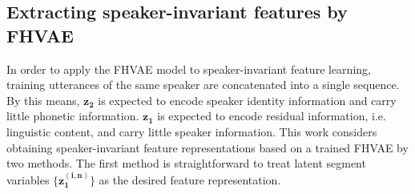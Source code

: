 \documentclass[a4paper]{article}
\begin{document}
\subsection{Extracting speaker-invariant features by FHVAE}
\label{subsec:spk_inv_feat}
In order to apply the FHVAE model to speaker-invariant feature learning, 
training utterances of the same speaker are concatenated into a single sequence.
By this means, 
$\bm{z_2}$ is expected to encode speaker identity information and  carry little phonetic information. $\bm{z_1}$ is expected to encode residual information, i.e. linguistic content, and carry little speaker information.
This work considers obtaining speaker-invariant feature representations based on a trained FHVAE by two methods. The first method is straightforward to treat 
latent segment variables $\{\bm{z_1^{(i,n)}}\}$ as the desired  feature representation. 
\end{document}
